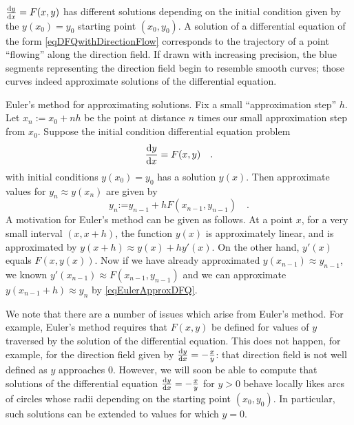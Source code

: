 \documentclass[12pt]{book}
\newcommand{\eqdef}{\textbf{:=}}
\begin{document}
$\frac{{\normalfont \text{d}} y}{{\normalfont \text{d}} x}= F(x,y)$ has different solutions depending on the initial condition given by the $y(x_0)=y_0$ starting point $(x_0, y_0)$. A solution of a differential equation of the form \eqref{eqDFQwithDirectionFlow} corresponds to the trajectory of a point ``flowing'' along the direction field. If drawn with increasing precision, the blue segments representing the direction field begin to resemble smooth curves; those curves indeed approximate solutions of the differential equation.

Euler's method for approximating solutions. Fix a small ``approximation step'' $h$. Let $x_n:=x_0+nh$ be the point at distance $n$ times our small approximation step from $x_0$. Suppose the initial condition differential equation problem
\[
\frac{{\normalfont \text{d}} y}{{\normalfont \text{d}} x}= F(x,y)\quad.
\]
with initial conditions $y(x_0)=y_0$  has a solution $y(x)$. Then approximate values for $y_n\approx y(x_n)$ are given by
\begin{equation}\label{eqEulerApproxDFQ}
y_n \eqdef y_{n-1} + h F(x_{n-1}, y_{n-1})\quad .
\end{equation}
A motivation for Euler's method can be given as follows. At a point $x$, for a very small interval $(x,x+h)$, the function $y(x)$ is approximately linear, and is approximated by $y(x+h)\approx y(x)+ h y'(x) $. On the other hand, $y'(x)$ equals $F(x, y(x))$. Now if we have already approximated $y(x_{n-1})\approx y_{n-1}$, we known $y'(x_{n-1}) \approx F(x_{n-1}, y_{n-1})$ and  we can approximate $y(x_{n-1}+h)\approx y_n $ by \eqref{eqEulerApproxDFQ}.


We note that there are a number of issues which arise from Euler's method. For example, Euler's method requires that $F(x,y)$ be defined for values of $y$ traversed by the solution of the differential equation. This does not happen, for example, for the direction field given by $\frac{{\normalfont \text{d}} y}{{\normalfont \text{d}} x}= - \frac{x}{y}$: that direction field is not well defined as $y$ approaches $0$. However, we will soon be able to compute that solutions of the differential equation  $\frac{{\normalfont \text{d}} y}{{\normalfont \text{d}} x}= -\frac{x}{y}$ for $y>0$ behave locally likes arcs of circles whose radii depending on the starting point $(x_0, y_0)$. In particular, such solutions can be extended to values for which $y=0$.
\end{document}
